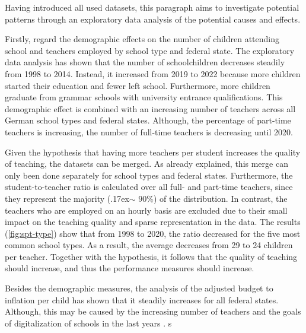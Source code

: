Having introduced all used datasets, this paragraph aims to investigate potential patterns through an exploratory data analysis of the potential causes and effects. 

Firstly, regard the demographic effects on the number of children attending school and teachers employed by school type and federal state. The exploratory data analysis has shown that the number of schoolchildren decreases steadily from 1998 to 2014. Instead, it increased from 2019 to 2022 because more children started their education and fewer left school. Furthermore, more children graduate from grammar schools with university entrance qualifications. This demographic effect is combined with an increasing number of teachers across all German school types and federal states. Although, the percentage of part-time teachers is increasing, the number of full-time teachers is decreasing until 2020.

Given the hypothesis that having more teachers per student increases the quality of teaching, the datasets can be merged. As already explained, this merge can only been done separately for school types and federal states. Furthermore, the student-to-teacher ratio is calculated over all full- and part-time teachers, since they represent the majority ({\raise.17ex\hbox{$\scriptstyle\mathtt{\sim}$}} $90\%$) of the distribution. In contrast, the teachers who are employed on an hourly basis are excluded due to their small impact on the teaching quality and sparse representation in the data. The results (\autoref{fig:spt-type}) show that from 1998 to 2020, the ratio decreased for the five most common school types. As a result, the average decreases from 29 to 24 children per teacher. Together with the hypothesis, it follows that the quality of teaching should increase, and thus the performance measures should increase.

Besides the demographic measures, the analysis of the adjusted budget to inflation per child has shown that it steadily increases for all federal states. Although, this may be caused by the increasing number of teachers and the goals of digitalization of schools in the last years \cite{cone_pandemic_2022}.
s

